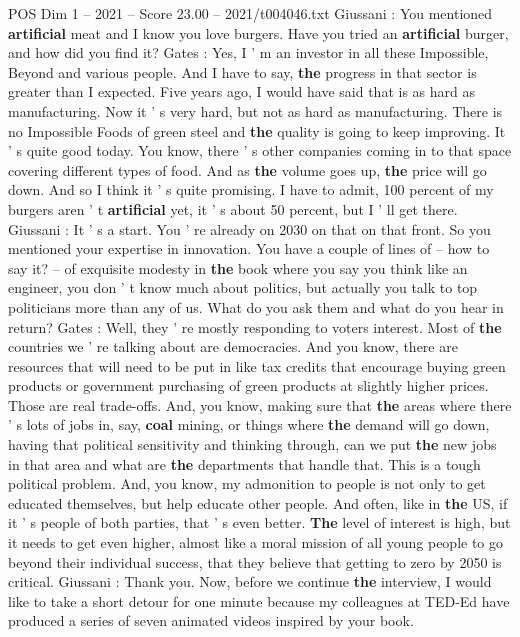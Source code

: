 \begin{textsample}{POS Dim 1 – 2021 – Score 23.00 – 2021/t004046.txt}
Giussani : You mentioned \textbf{artificial} meat and I know you love burgers.
Have you tried an \textbf{artificial} burger, and how did you find it?
Gates : Yes, I ' m an investor in all these Impossible, Beyond and various people.
And I have to say, \textbf{the} progress in that sector is greater than I expected.
Five years ago, I would have said that is as hard as manufacturing.
Now it ' s very hard, but not as hard as manufacturing.
There is no Impossible Foods of green steel and \textbf{the} quality is going to keep improving.
It ' s quite good today.
You know, there ' s other companies coming in to that space covering different types of food.
And as \textbf{the} volume goes up, \textbf{the} price will go down.
And so I think it ' s quite promising.
I have to admit, 100 percent of my burgers aren ' t \textbf{artificial} yet, it ' s about 50 percent, but I ' ll get there.
Giussani : It ' s a start.
You ' re already on 2030 on that on that front.
So you mentioned your expertise in innovation.
You have a couple of lines of -- how to say it? -- of exquisite modesty in \textbf{the} book where you say you think like an engineer, you don ' t know much about politics, but actually you talk to top politicians more than any of us.
What do you ask them and what do you hear in return?
Gates : Well, they ' re mostly responding to voters interest.
Most of \textbf{the} countries we ' re talking about are democracies.
And you know, there are resources that will need to be put in like tax credits that encourage buying green products or government purchasing of green products at slightly higher prices.
Those are real trade-offs.
And, you know, making sure that \textbf{the} areas where there ' s lots of jobs in, say, \textbf{coal} mining, or things where \textbf{the} demand will go down, having that political sensitivity and thinking through, can we put \textbf{the} new jobs in that area and what are \textbf{the} departments that handle that.
This is a tough political problem.
And, you know, my admonition to people is not only to get educated themselves, but help educate other people.
And often, like in \textbf{the} US, if it ' s people of both parties, that ' s even better. \textbf{The} level of interest is high, but it needs to get even higher, almost like a moral mission of all young people to go beyond their individual success, that they believe that getting to zero by 2050 is critical.
Giussani : Thank you.
Now, before we continue \textbf{the} interview, I would like to take a short detour for one minute because my colleagues at TED-Ed have produced a series of seven animated videos inspired by your book.

\end{textsample}
